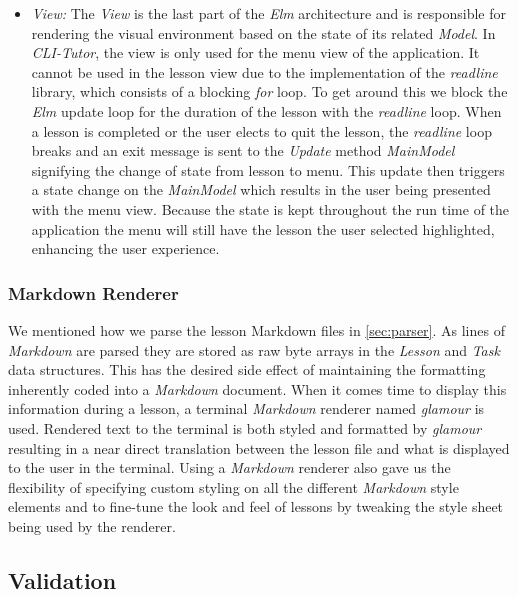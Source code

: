 \begin{itemize}
\item \textit{View:} The \textit{View} is the last part of the \textit{Elm}
    architecture and is responsible for rendering the visual environment based
    on the state of its related \textit{Model}. In \textit{CLI-Tutor}, the view
    is only used for the menu view of the application. It cannot be used in the
    lesson view due to the implementation of the \textit{readline} library,
    which consists of a blocking \textit{for} loop. To get around this we
    block the \textit{Elm} update loop for the duration of the lesson with the
    \textit{readline} loop. When a lesson is completed or the user elects to
    quit the lesson, the \textit{readline} loop breaks and an exit message is
    sent to the \textit{Update} method \textit{MainModel} signifying the change
    of state from lesson to menu. This update then triggers a state change on
    the \textit{MainModel} which results in the user being presented with the
    menu view. Because the state is kept throughout the run time of the
    application the menu will still have the lesson the user selected
    highlighted, enhancing the user experience.

\end{itemize}

\subsubsection{Markdown Renderer}

We mentioned how we parse the lesson Markdown files in \autoref{sec:parser}. As
lines of \textit{Markdown} are parsed they are stored as raw byte arrays in the
\textit{Lesson} and \textit{Task} data structures. This has the desired side
effect of maintaining the formatting inherently coded into a \textit{Markdown}
document. When it comes time to display this information during a lesson, a
terminal \textit{Markdown} renderer named \textit{glamour} is used. Rendered
text to the terminal is both styled and formatted by \textit{glamour} resulting
in a near direct translation between the lesson file and what is displayed to
the user in the terminal. Using a \textit{Markdown} renderer also gave us the
flexibility of specifying custom styling on all the different \textit{Markdown}
style elements and to fine-tune the look and feel of lessons by tweaking the
style sheet being used by the renderer.

\subsection{Validation}

